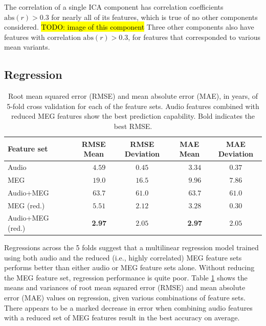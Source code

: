 \documentclass[utf8]{frontiersSCNS} %
\begin{document}
The correlation of a single ICA component has correlation coefficients $\text{abs}(r)>0.3$ for nearly all of its features, which is true of no other components considered. \hl{TODO: image of this component} Three other components also have features with correlation $\text{abs}(r)>0.3$, for features that corresponded to various mean variants.

\subsection{Regression}

\begin{table}[t]
  \centering
  \label{tab:reg_results}
  \begin{tabular}{ l | c | c | c | c }
    \toprule
    \textbf{Feature set} & \textbf{RMSE Mean} & \textbf{RMSE Deviation} & \textbf{MAE Mean} & \textbf{MAE Deviation}       \\
    \toprule
        Audio~~~                             & ~~~$4.59$         &     $0.45$     & ~~~$3.34$         &     $0.37$       \\
        MEG~~~                               & ~~~$19.0$         &     $16.5$     & ~~~$9.96$         &     $7.86$       \\
        Audio+MEG~~~                         & ~~~$63.7$         &     $61.0$     & ~~~$63.7$         &     $61.0$       \\

        \midrule
       
        MEG (red.)~~~                        & ~~~$5.51$         &     $2.12$    & ~~~$3.28$          &     $0.30$       \\
        Audio+MEG (red.)~~~                  & ~~~\textbf{2.97}  &     $2.05$    & ~~~\textbf{2.97}         &     $2.05$      \\

    \hline
  \end{tabular}
  \caption{Root mean squared error (RMSE) and mean absolute error (MAE), in years, of 5-fold cross validation for each of the feature sets. Audio features combined with reduced MEG features show the best prediction capability. Bold indicates the best RMSE.}
\end{table}

Regressions across the 5 folds suggest that a multilinear regression model trained using both audio and the reduced (i.e., highly correlated) MEG feature sets performs better than either audio or MEG feature sets alone. Without reducing the MEG feature set, regression performance is quite poor. Table \ref{tab:reg_results} shows the means and variances of root mean squared error (RMSE) and mean absolute error (MAE) values on regression, given various combinations of feature sets. There appears to be a marked decrease in error when combining audio features with a reduced set of MEG features result in the best accuracy on average.
\end{document}
